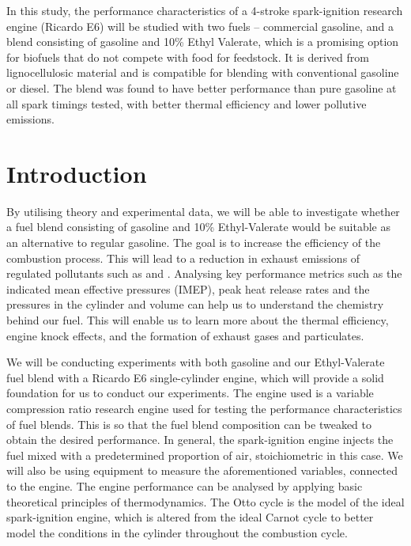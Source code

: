 \documentclass[11pt]{article}
\begin{document}
In this study, the performance characteristics of a 4-stroke spark-ignition research engine (Ricardo E6) will be studied with two fuels – commercial gasoline, and a blend consisting of gasoline and 10\% Ethyl Valerate, which is a promising option for biofuels that do not compete with food for feedstock. It is derived from lignocellulosic material and is compatible for blending with conventional gasoline or diesel. The blend was found to have better performance than pure gasoline at all spark timings tested, with better thermal efficiency and lower pollutive emissions. 
\section{Introduction}
By utilising theory and experimental data, we will be able to investigate whether a fuel blend consisting of gasoline and 10\% Ethyl-Valerate would be suitable as an alternative to regular gasoline. The goal is to increase the efficiency of the combustion process. This will lead to a reduction in exhaust emissions of regulated pollutants such as  and . Analysing key performance metrics such as the indicated mean effective pressures (IMEP), peak heat release rates and the pressures in the cylinder and volume can help us to understand the chemistry behind our fuel. This will enable us to learn more about the thermal efficiency, engine knock effects, and the formation of exhaust gases and particulates. 

We will be conducting experiments with both gasoline and our Ethyl-Valerate fuel blend with a Ricardo E6 single-cylinder engine, which will provide a solid foundation for us to conduct our experiments. The engine used is a variable compression ratio research engine used for testing the performance characteristics of fuel blends. This is so that the fuel blend composition can be tweaked to obtain the desired performance. In general, the spark-ignition engine injects the fuel mixed with a predetermined proportion of air, stoichiometric in this case. We will also be using equipment to measure the aforementioned variables, connected to the engine. The engine performance can be analysed by applying basic theoretical principles of thermodynamics. The Otto cycle is the model of the ideal spark-ignition engine, which is altered from the ideal Carnot cycle to better model the conditions in the cylinder throughout the combustion cycle.
\end{document}
